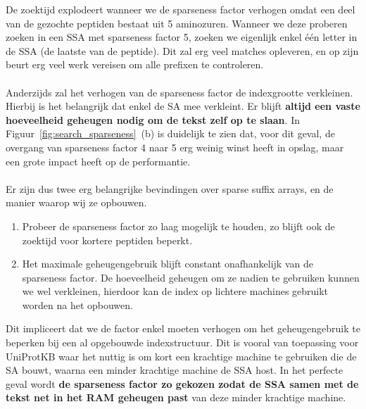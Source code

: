 De zoektijd explodeert wanneer we de sparseness factor verhogen omdat een deel van de gezochte peptiden bestaat uit 5 aminozuren.
Wanneer we deze proberen zoeken in een SSA met sparseness factor 5, zoeken we eigenlijk enkel één letter in de SSA (de laatste van de peptide).
Dit zal erg veel matches opleveren, en op zijn beurt erg veel werk vereisen om alle prefixen te controleren.
\\ \\
Anderzijds zal het verhogen van de sparseness factor de indexgrootte verkleinen.
Hierbij is het belangrijk dat enkel de SA mee verkleint.
Er blijft \textbf{altijd een vaste hoeveelheid geheugen nodig om de tekst zelf op te slaan}.
In Figuur~\ref{fig:search_sparseness}~(b) is duidelijk te zien dat, voor dit geval, de overgang van sparseness factor 4 naar 5 erg weinig winst heeft in opslag, maar een grote impact heeft op de performantie.
\\ \\
Er zijn dus twee erg belangrijke bevindingen over sparse suffix arrays, en de manier waarop wij ze opbouwen.
\begin{enumerate}
    \item Probeer de sparseness factor zo laag mogelijk te houden, zo blijft ook de zoektijd voor kortere peptiden beperkt.
    \item Het maximale geheugengebruik blijft constant onafhankelijk van de sparseness factor.
    De hoeveelheid geheugen om ze nadien te gebruiken kunnen we wel verkleinen, hierdoor kan de index op lichtere machines gebruikt worden na het opbouwen.
\end{enumerate}

Dit impliceert dat we de factor enkel moeten verhogen om het geheugengebruik te beperken bij een al opgebouwde indexstructuur.
Dit is vooral van toepassing voor UniProtKB waar het nuttig is om kort een krachtige machine te gebruiken die de SA bouwt, waarna een minder krachtige machine de SSA host.
In het perfecte geval wordt \textbf{de sparseness factor zo gekozen zodat de SSA samen met de tekst net in het RAM geheugen past} van deze minder krachtige machine.

